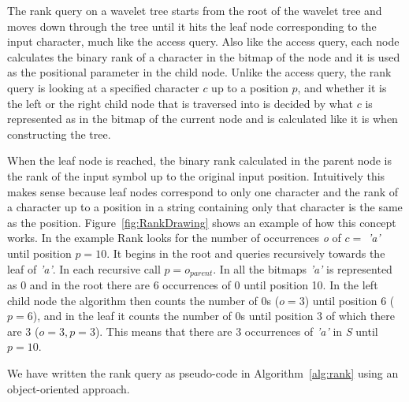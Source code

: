 The rank query on a wavelet tree starts from the root of the wavelet tree and moves down through the tree until it hits the leaf node corresponding to the input character, much like the access query.
Also like the access query, each node calculates the binary rank of a character in the bitmap of the node and it is used as the positional parameter in the child node.
Unlike the access query, the rank query is looking at a specified character $c$ up to a position $p$, and whether it is the left or the right child node that is traversed into is decided by what $c$ is represented as in the bitmap of the current node and is calculated like it is when constructing the tree.

When the leaf node is reached, the binary rank calculated in the parent node is the rank of the input symbol up to the original input position.
Intuitively this makes sense because leaf nodes correspond to only one character and the rank of a character up to a position in a string containing only that character is the same as the position.
Figure~\ref{fig:RankDrawing} shows an example of how this concept works.
In the example Rank looks for the number of occurrences \textit{o} of $c = $ \textit{'a'} until position $p = 10$.
It begins in the root and queries recursively towards the leaf of \textit{'a'}. 
In each recursive call $p = o_{parent}$. 
In all the bitmaps \textit{'a'} is represented as 0 and in the root there are 6 occurrences of 0 until position 10. 
In the left child node the algorithm then counts the number of 0s ($o=3$) until position 6 ($p=6$), and in the leaf it counts the number of 0s until position 3 of which there are 3 ($o=3, p=3$). 
This means that there are 3 occurrences of \textit{'a'} in \textit{S} until $p=10$.

We have written the rank query as pseudo-code in Algorithm~\ref{alg:rank} using an object-oriented approach.

